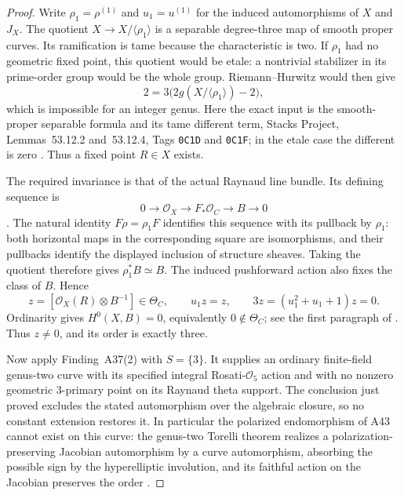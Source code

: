 \documentclass[11pt,a4paper]{article}
\begin{document}
\begin{proof}
Write $\rho_1=\rho^{(1)}$ and $u_1=u^{(1)}$ for the induced
automorphisms of $X$ and $J_X$.  The quotient
$X\to X/\langle\rho_1\rangle$ is a separable degree-three map
of smooth proper curves.  Its ramification is tame because the
characteristic is two.  If $\rho_1$ had no geometric fixed point,
this quotient would be etale: a nontrivial stabilizer in its
prime-order group would be the whole group.  Riemann--Hurwitz
would then give
\[
                    2=3\bigl(2g(X/\langle\rho_1\rangle)-2\bigr),
\]
which is impossible for an integer genus.  Here the exact input is
the smooth-proper separable formula and its tame different term,
Stacks Project, Lemmas~53.12.2 and~53.12.4, Tags
\texttt{0C1D} and \texttt{0C1F}; in the etale case the different
is zero \cite{StacksRH}.  Thus a fixed point $R\in X$ exists.

The required invariance is that of the actual Raynaud line bundle.
Its defining sequence is
\[
 0\longrightarrow\mathcal O_X\longrightarrow F_*\mathcal O_C
                     \longrightarrow B\longrightarrow0
\]
\cite[Section~8.1, p.~472]{OzmanPries2019}.
The natural identity $F\rho=\rho_1F$ identifies this sequence
with its pullback by $\rho_1$: both horizontal maps in the
corresponding square are isomorphisms, and their pullbacks
identify the displayed inclusion of structure sheaves.
Taking the quotient therefore gives $\rho_1^*B\simeq B$.
The induced pushforward action also fixes the class of $B$.
Hence
\[
 z=[\mathcal O_X(R)\otimes B^{-1}]
     \in\Theta_C,\qquad u_1z=z,
     \qquad 3z=(u_1^2+u_1+1)z=0.
\]
Ordinarity gives $H^0(X,B)=0$, equivalently
$0\notin\Theta_C$; see the first paragraph of
\cite[Section~8.2, p.~472]{OzmanPries2019}.
Thus $z\ne0$, and its order is exactly three.

Now apply Finding~A37(2) with $S=\{3\}$.
It supplies an ordinary finite-field genus-two curve with its
specified integral Rosati-$\mathcal O_5$ action and with no
nonzero geometric $3$-primary point on its Raynaud theta support.
The conclusion just proved excludes the stated automorphism
over the algebraic closure, so no constant extension restores it.
In particular the polarized endomorphism of A43 cannot exist on
this curve: the genus-two Torelli theorem realizes a
polarization-preserving Jacobian automorphism by a curve
automorphism, absorbing the possible sign by the hyperelliptic
involution, and its faithful action on the Jacobian preserves
the order \cite[Theorem~12.1]{MilneJV}.
\end{proof}
\end{document}
